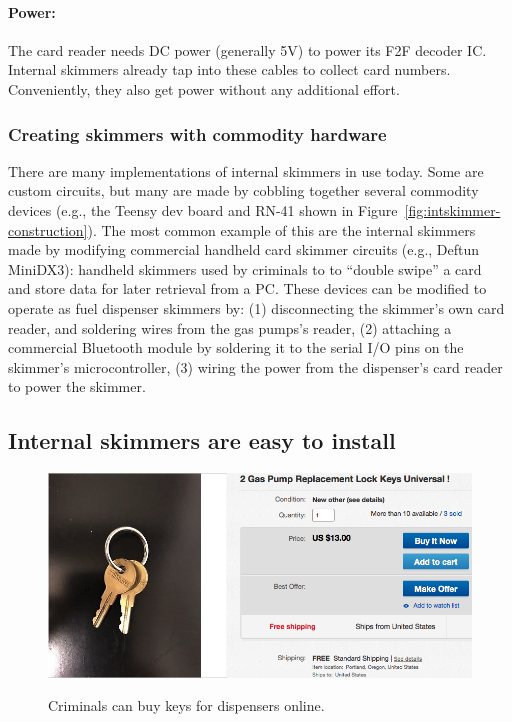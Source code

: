 \paragraph{Power:}
%
The card reader needs DC power (generally 5V) to power its F2F decoder IC.
%
Internal skimmers already tap into these cables to collect card numbers.
Conveniently, they also get power without any additional effort.

\subsubsection{Creating skimmers with commodity hardware}
\label{sec:background:commodity}
%
There are many implementations of internal skimmers in use today.
%
Some are custom circuits, but many are made by cobbling together several
commodity devices (e.g., the Teensy dev board and RN-41 shown in
Figure~\ref{fig:intskimmer-construction}).
%
The most common example of this are the internal skimmers made by modifying
commercial handheld card skimmer circuits (e.g., Deftun MiniDX3):
%
handheld skimmers used by criminals to to ``double swipe'' a
card~\cite{cardforensics} and store data for later retrieval from a PC.
%
These devices can be modified to operate as fuel dispenser skimmers by: (1)
disconnecting the skimmer's own card reader, and soldering wires from the gas
pumps's reader, (2) attaching a commercial Bluetooth module by soldering it to
the serial I/O pins on the skimmer's microcontroller, (3) wiring the power from
the dispenser's card reader to power the skimmer.

\subsection{Internal skimmers are easy to install} %
\label{sec:background:install}

\begin{figure}
\centering
\includegraphics[width=\linewidth]{fig/universalkey.png}\\
\caption{
\label{fig:universalkey}
Criminals can buy keys for dispensers online.
}
\end{figure}

